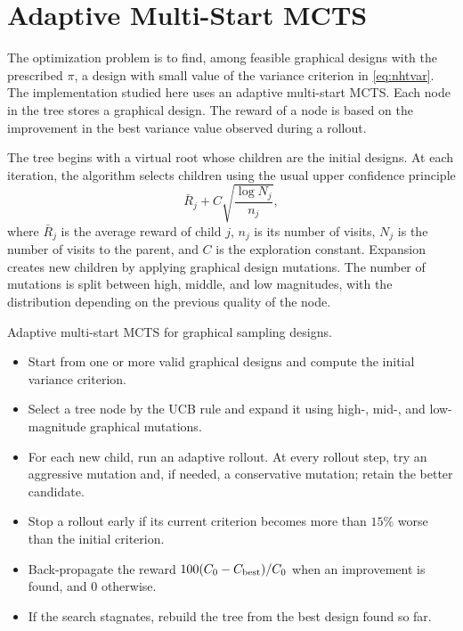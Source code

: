 \documentclass[twoside]{article}
\begin{document}
\section{Adaptive Multi-Start MCTS}

The optimization problem is to find, among feasible graphical designs with
the prescribed $\pi$, a design with small value of the variance criterion
in \eqref{eq:nhtvar}. The implementation studied here uses an adaptive
multi-start MCTS. Each node in the tree stores a graphical design. The reward
of a node is based on the improvement in the best variance value observed
during a rollout.

The tree begins with a virtual root whose children are the initial designs.
At each iteration, the algorithm selects children using the usual upper
confidence principle
\[
    \bar R_j + C\sqrt{\frac{\log N_j}{n_j}},
\]
where $\bar R_j$ is the average reward of child $j$, $n_j$ is its number of
visits, $N_j$ is the number of visits to the parent, and $C$ is the
exploration constant. Expansion creates new children by applying graphical
design mutations. The number of mutations is split between high, middle, and
low magnitudes, with the distribution depending on the previous quality of
the node.

\begin{alg}\label{alg:mcts}
Adaptive multi-start MCTS for graphical sampling designs.
\begin{itemize}
\item Start from one or more valid graphical designs and compute the initial
      variance criterion.
\item Select a tree node by the UCB rule and expand it using high-, mid-, and
      low-magnitude graphical mutations.
\item For each new child, run an adaptive rollout. At every rollout step,
      try an aggressive mutation and, if needed, a conservative mutation;
      retain the better candidate.
\item Stop a rollout early if its current criterion becomes more than
      $15\%$ worse than the initial criterion.
\item Back-propagate the reward
      $100(C_0-C_{\rm best})/C_0$ when an improvement is found, and $0$
      otherwise.
\item If the search stagnates, rebuild the tree from the best design found
      so far.
\end{itemize}
\end{alg}
\end{document}
